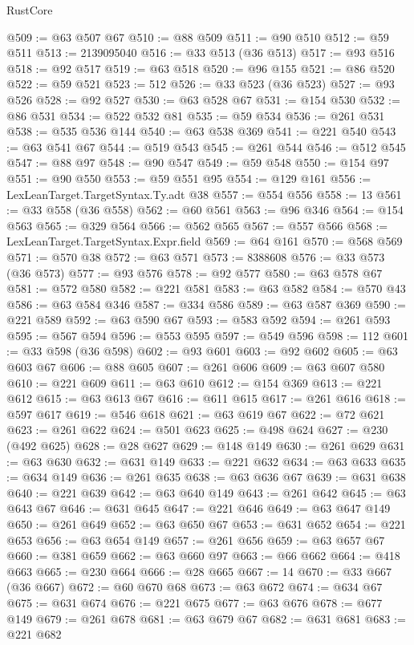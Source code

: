 \begin{lexlean}{RustCore}
\begin{coremodule}
@509 := @63 @507 @67
@510 := @88 @509
@511 := @90 @510
@512 := @59 @511
@513 := 2139095040
@516 := @33 @513 (@36 @513)
@517 := @93 @516
@518 := @92 @517
@519 := @63 @518
@520 := @96 @155
@521 := @86 @520
@522 := @59 @521
@523 := 512
@526 := @33 @523 (@36 @523)
@527 := @93 @526
@528 := @92 @527
@530 := @63 @528 @67
@531 := @154 @530
@532 := @86 @531
@534 := @522 @532 @81
@535 := @59 @534
@536 := @261 @531
@538 := @535 @536 @144
@540 := @63 @538 @369
@541 := @221 @540
@543 := @63 @541 @67
@544 := @519 @543
@545 := @261 @544
@546 := @512 @545
@547 := @88 @97
@548 := @90 @547
@549 := @59 @548
@550 := @154 @97
@551 := @90 @550
@553 := @59 @551 @95
@554 := @129 @161
@556 := LexLeanTarget.TargetSyntax.Ty.adt @38
@557 := @554 @556
@558 := 13
@561 := @33 @558 (@36 @558)
@562 := @60 @561
@563 := @96 @346
@564 := @154 @563
@565 := @329 @564
@566 := @562 @565
@567 := @557 @566
@568 := LexLeanTarget.TargetSyntax.Expr.field
@569 := @64 @161
@570 := @568 @569
@571 := @570 @38
@572 := @63 @571
@573 := 8388608
@576 := @33 @573 (@36 @573)
@577 := @93 @576
@578 := @92 @577
@580 := @63 @578 @67
@581 := @572 @580
@582 := @221 @581
@583 := @63 @582
@584 := @570 @43
@586 := @63 @584 @346
@587 := @334 @586
@589 := @63 @587 @369
@590 := @221 @589
@592 := @63 @590 @67
@593 := @583 @592
@594 := @261 @593
@595 := @567 @594
@596 := @553 @595
@597 := @549 @596
@598 := 112
@601 := @33 @598 (@36 @598)
@602 := @93 @601
@603 := @92 @602
@605 := @63 @603 @67
@606 := @88 @605
@607 := @261 @606
@609 := @63 @607 @580
@610 := @221 @609
@611 := @63 @610
@612 := @154 @369
@613 := @221 @612
@615 := @63 @613 @67
@616 := @611 @615
@617 := @261 @616
@618 := @597 @617
@619 := @546 @618
@621 := @63 @619 @67
@622 := @72 @621
@623 := @261 @622
@624 := @501 @623
@625 := @498 @624
@627 := @230 (@492 @625)
@628 := @28 @627
@629 := @148 @149
@630 := @261 @629
@631 := @63 @630
@632 := @631 @149
@633 := @221 @632
@634 := @63 @633
@635 := @634 @149
@636 := @261 @635
@638 := @63 @636 @67
@639 := @631 @638
@640 := @221 @639
@642 := @63 @640 @149
@643 := @261 @642
@645 := @63 @643 @67
@646 := @631 @645
@647 := @221 @646
@649 := @63 @647 @149
@650 := @261 @649
@652 := @63 @650 @67
@653 := @631 @652
@654 := @221 @653
@656 := @63 @654 @149
@657 := @261 @656
@659 := @63 @657 @67
@660 := @381 @659
@662 := @63 @660 @97
@663 := @66 @662
@664 := @418 @663
@665 := @230 @664
@666 := @28 @665
@667 := 14
@670 := @33 @667 (@36 @667)
@672 := @60 @670 @68
@673 := @63 @672
@674 := @634 @67
@675 := @631 @674
@676 := @221 @675
@677 := @63 @676
@678 := @677 @149
@679 := @261 @678
@681 := @63 @679 @67
@682 := @631 @681
@683 := @221 @682

\end{coremodule}
\end{lexlean}
